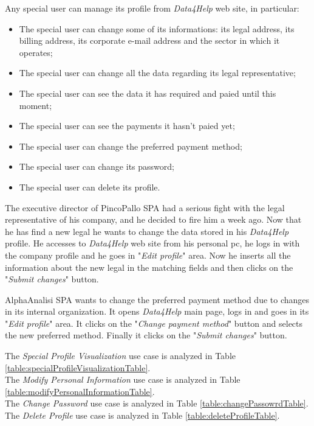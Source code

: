 Any special user can manage its profile from \textit{Data4Help} web site, in particular:
\begin{itemize}
  \item The special user can change some of its informations: its legal address, its billing address, its corporate e-mail address and the sector in which it operates;
  \item The special user can change all the data regarding its legal representative;
  \item The special user can see the data it has required and paied until this moment;
  \item The special user can see the payments it hasn't paied yet;
  \item The special user can change the preferred payment method;
  \item The special user can change its password;
  \item The special user can delete its profile.
\end{itemize}

The executive director of PincoPallo SPA had a serious fight with the legal representative of his company, and he decided to fire him a week ago. Now that he has find a new legal he wants to change the data stored in his \textit{Data4Help} profile. He accesses to \textit{Data4Help} web site from his personal pc, he logs in with the company profile and he goes in "\textit{Edit profile}" area. Now he inserts all the information about the new legal in the matching fields and then clicks on the "\textit{Submit changes}" button.

AlphaAnalisi SPA wants to change the preferred payment method due to changes in its internal organization. It opens \textit{Data4Help} main page, logs in and goes in its "\textit{Edit profile}" area. It clicks on the "\textit{Change payment method}" button and selects the new preferred method. Finally it clicks on the "\textit{Submit changes}" button.

The \textit{Special Profile Visualization} use case is analyzed in Table \ref{table:specialProfileVisualizationTable}. \\
The \textit{Modify Personal Information} use case is analyzed in Table \ref{table:modifyPersonalInformationTable}. \\
The \textit{Change Password} use case is analyzed in Table \ref{table:changePassowrdTable}. \\
The \textit{Delete Profile} use case is analyzed in Table \ref{table:deleteProfileTable}. \\

